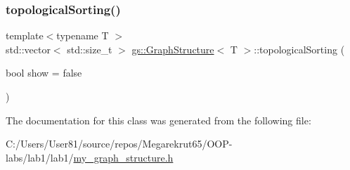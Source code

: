 \mbox{\label{classgs_1_1_graph_structure_aaaccde89d753affe1ca96ad3a25a03b0}} 
\subsubsection{\texorpdfstring{topological\+Sorting()}{topologicalSorting()}}
{\footnotesize\ttfamily template$<$typename T $>$ \\
std\+::vector$<$ std\+::size\+\_\+t $>$ \mbox{\hyperlink{classgs_1_1_graph_structure}{gs\+::\+Graph\+Structure}}$<$ T $>$\+::topological\+Sorting (\begin{DoxyParamCaption}\item[{bool}]{show = {\ttfamily false} }\end{DoxyParamCaption})}



The documentation for this class was generated from the following file\+:\begin{DoxyCompactItemize}
\item 
C\+:/\+Users/\+User81/source/repos/\+Megarekrut65/\+O\+O\+P-\/labs/lab1/lab1/\mbox{\hyperlink{my__graph__structure_8h}{my\+\_\+graph\+\_\+structure.\+h}}\end{DoxyCompactItemize}
